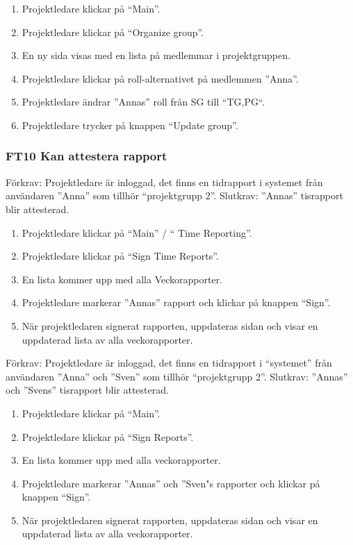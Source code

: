 \documentclass[paper=a4, fontsize=11pt,twoside]{article}
\begin{document}
	\begin{enumerate}
	 \item Projektledare klickar på “Main”.
	\item Projektledare klickar på “Organize group”.
	\item En ny sida visas med en lista på medlemmar i projektgruppen.
	\item Projektledare klickar på roll-alternativet på medlemmen ”Anna”.
	\item Projektledare ändrar ”Annas” roll från SG till “TG,PG“.
	\item Projektledare trycker på knappen “Update group”.

	  
	\end{enumerate}

	\subsubsection*{FT10 Kan attestera rapport}
		Förkrav: Projektledare är inloggad, det finns en tidrapport i systemet från
		användaren  ”Anna” som tillhör “projektgrupp 2”.
		\newline
		Slutkrav: ”Annas” tisrapport blir attesterad.
		
		\begin{enumerate}
		  \item Projektledare klickar på “Main” / “ Time Reporting”.
		  \item Projektledare klickar på “Sign Time Reports”.
		  \item En lista kommer upp med alla Veckorapporter.
		  \item Projektledare  markerar ”Annas” rapport och klickar på knappen “Sign”.
		  \item När projektledaren signerat rapporten, uppdateras sidan och visar en
	uppdaterad lista av alla veckorapporter.
		  
		\end{enumerate}
		
		Förkrav: Projektledare är inloggad, det finns en tidrapport i “systemet” från
		användaren  ”Anna” och ”Sven” som tillhör “projektgrupp 2”.
		\newline
		Slutkrav: ”Annas” och ”Svens” tisrapport blir attesterad.
		
		\begin{enumerate}
    		\item Projektledare klickar på “Main”.
			\item Projektledare klickar på “Sign Reports”.
			\item En lista kommer upp med alla veckorapporter.
			\item Projektledare  markerar ”Annas” och ”Sven"s rapporter och klickar på
			knappen “Sign”.
			\item När projektledaren signerat rapporten, uppdateras sidan och visar en
			uppdaterad lista av alla veckorapporter.

				  

		\end{enumerate}
		
\end{document}
